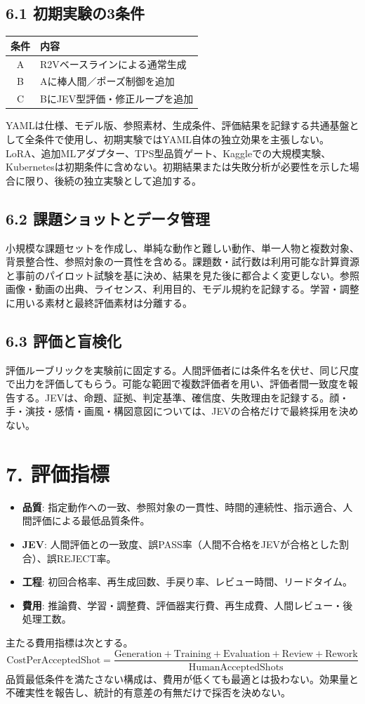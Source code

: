 \documentclass[11pt,a4paper]{article}
\begin{document}
\subsection*{6.1 初期実験の3条件}
\begin{center}
\begin{tabularx}{\linewidth}{cX}
\toprule
条件 & 内容 \\
\midrule
A & R2Vベースラインによる通常生成 \\
B & Aに棒人間／ポーズ制御を追加 \\
C & BにJEV型評価・修正ループを追加 \\
\bottomrule
\end{tabularx}
\end{center}
YAMLは仕様、モデル版、参照素材、生成条件、評価結果を記録する共通基盤として全条件で使用し、初期実験ではYAML自体の独立効果を主張しない。LoRA、追加MLアダプター、TPS型品質ゲート、Kaggleでの大規模実験、Kubernetesは初期条件に含めない。初期結果または失敗分析が必要性を示した場合に限り、後続の独立実験として追加する。

\subsection*{6.2 課題ショットとデータ管理}
小規模な課題セットを作成し、単純な動作と難しい動作、単一人物と複数対象、背景整合性、参照対象の一貫性を含める。課題数・試行数は利用可能な計算資源と事前のパイロット試験を基に決め、結果を見た後に都合よく変更しない。参照画像・動画の出典、ライセンス、利用目的、モデル規約を記録する。学習・調整に用いる素材と最終評価素材は分離する。

\subsection*{6.3 評価と盲検化}
評価ルーブリックを実験前に固定する。人間評価者には条件名を伏せ、同じ尺度で出力を評価してもらう。可能な範囲で複数評価者を用い、評価者間一致度を報告する。JEVは、命題、証拠、判定基準、確信度、失敗理由を記録する。顔・手・演技・感情・画風・構図意図については、JEVの合格だけで最終採用を決めない。

\section*{7. 評価指標}
\begin{itemize}[nosep]
\item \textbf{品質}: 指定動作への一致、参照対象の一貫性、時間的連続性、指示適合、人間評価による最低品質条件。
\item \textbf{JEV}: 人間評価との一致度、誤PASS率（人間不合格をJEVが合格とした割合）、誤REJECT率。
\item \textbf{工程}: 初回合格率、再生成回数、手戻り率、レビュー時間、リードタイム。
\item \textbf{費用}: 推論費、学習・調整費、評価器実行費、再生成費、人間レビュー・後処理工数。
\end{itemize}
主たる費用指標は次とする。
\[
\mathrm{CostPerAcceptedShot} =
\frac{\mathrm{Generation}+\mathrm{Training}+\mathrm{Evaluation}+\mathrm{Review}+\mathrm{Rework}}
{\mathrm{HumanAcceptedShots}}
\]
品質最低条件を満たさない構成は、費用が低くても最適とは扱わない。効果量と不確実性を報告し、統計的有意差の有無だけで採否を決めない。
\end{document}
